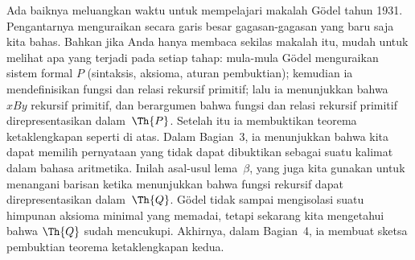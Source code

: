 \documentclass[../../../include/open-logic-section]{subfiles}
\begin{document}


Ada baiknya meluangkan waktu untuk mempelajari makalah G\"odel tahun 1931.
Pengantarnya menguraikan secara garis besar gagasan-gagasan yang baru saja
kita bahas. Bahkan jika Anda hanya membaca sekilas makalah itu, mudah untuk
melihat apa yang terjadi pada setiap tahap: mula-mula G\"odel menguraikan
sistem formal $P$ (sintaksis, aksioma, aturan pembuktian); kemudian ia
mendefinisikan fungsi dan relasi rekursif primitif; lalu ia menunjukkan bahwa
$x B y$ rekursif primitif, dan berargumen bahwa fungsi dan relasi rekursif
primitif direpresentasikan dalam~$\Th{P}$. Setelah itu ia membuktikan teorema
ketaklengkapan seperti di atas. Dalam Bagian~3, ia menunjukkan bahwa kita
dapat memilih pernyataan yang tidak dapat dibuktikan sebagai suatu kalimat
dalam bahasa aritmetika. Inilah asal-usul lema~$\beta$, yang juga kita
gunakan untuk menangani barisan ketika menunjukkan bahwa fungsi rekursif
dapat direpresentasikan dalam~$\Th{Q}$. G\"odel tidak sampai mengisolasi
suatu himpunan aksioma minimal yang memadai, tetapi sekarang kita mengetahui
bahwa $\Th{Q}$ sudah mencukupi. Akhirnya, dalam Bagian~4, ia membuat sketsa
pembuktian teorema ketaklengkapan kedua.
\end{document}
